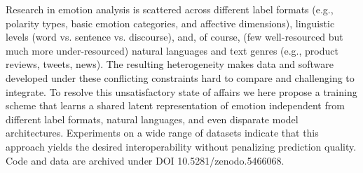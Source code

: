 Research in emotion analysis is scattered across different label formats  (e.g., polarity types, basic emotion categories, and affective dimensions), linguistic levels (word vs. sentence vs. discourse), and, of course, (few well-resourced but much more under-resourced) natural languages and text genres (e.g., product reviews, tweets, news). The resulting heterogeneity makes data and software developed under these conflicting constraints hard to compare and challenging to integrate. To resolve this unsatisfactory state of affairs we here propose a training scheme that learns a shared latent representation of emotion independent from different label formats, natural languages, and even disparate model architectures. Experiments on a wide range of datasets indicate that this approach yields the desired interoperability without penalizing prediction quality. Code and data are archived under DOI 10.5281/zenodo.5466068.
